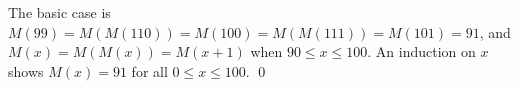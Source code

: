 \begin{pf} \rm
The basic case is $M(99) = M(M(110)) = M(100) = M(M(111)) = M(101) = 91$, and
$M(x) = M(M(x)) = M(x + 1)$ when $90 \leq x \leq 100$.
An induction on $x$ shows $M(x)=91$ for all $0\leq x\leq 100$. \qed
\end{pf}

